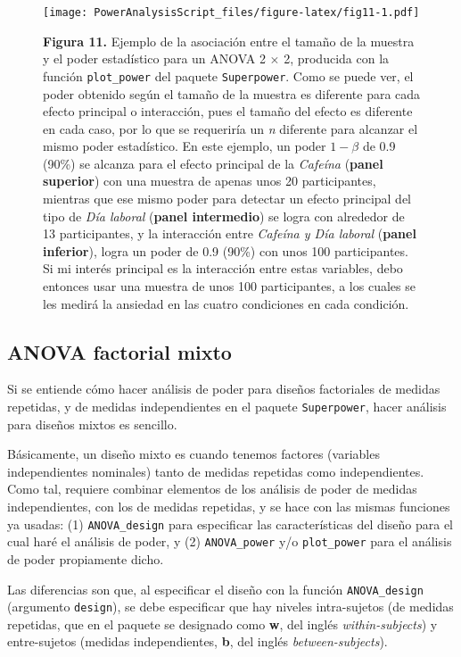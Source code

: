 \documentclass[
]{article}
\begin{document}
\begin{figure}
\centering
\texttt{[image: PowerAnalysisScript\_files/figure-latex/fig11-1.pdf]}
\caption{\textbf{Figura 11.} Ejemplo de la asociación entre el tamaño de
la muestra y el poder estadístico para un ANOVA 2 \(\times\) 2,
producida con la función \texttt{plot\_power} del paquete
\texttt{Superpower}. Como se puede ver, el poder obtenido según el
tamaño de la muestra es diferente para cada efecto principal o
interacción, pues el tamaño del efecto es diferente en cada caso, por lo
que se requeriría un \emph{n} diferente para alcanzar el mismo poder
estadístico. En este ejemplo, un poder \(1-\beta\) de 0.9 (90\%) se
alcanza para el efecto principal de la \emph{Cafeína} (\textbf{panel
superior}) con una muestra de apenas unos 20 participantes, mientras que
ese mismo poder para detectar un efecto principal del tipo de \emph{Día
laboral} (\textbf{panel intermedio}) se logra con alrededor de 13
participantes, y la interacción entre \emph{Cafeína y Día laboral}
(\textbf{panel inferior}), logra un poder de 0.9 (90\%) con unos 100
participantes. Si mi interés principal es la interacción entre estas
variables, debo entonces usar una muestra de unos 100 participantes, a
los cuales se les medirá la ansiedad en las cuatro condiciones en cada
condición.}
\end{figure}

\hypertarget{anova-factorial-mixto}{%
\subsection{ANOVA factorial mixto}\label{anova-factorial-mixto}}

Si se entiende cómo hacer análisis de poder para diseños factoriales de
medidas repetidas, y de medidas independientes en el paquete
\texttt{Superpower}, hacer análisis para diseños mixtos es sencillo.

Básicamente, un diseño mixto es cuando tenemos factores (variables
independientes nominales) tanto de medidas repetidas como
independientes. Como tal, requiere combinar elementos de los análisis de
poder de medidas independientes, con los de medidas repetidas, y se hace
con las mismas funciones ya usadas: (1) \texttt{ANOVA\_design} para
especificar las características del diseño para el cual haré el análisis
de poder, y (2) \texttt{ANOVA\_power} y/o \texttt{plot\_power} para el
análisis de poder propiamente dicho.

Las diferencias son que, al especificar el diseño con la función
\texttt{ANOVA\_design} (argumento \texttt{design}), se debe especificar
que hay niveles intra-sujetos (de medidas repetidas, que en el paquete
se designado como \textbf{w}, del inglés \emph{within-subjects}) y
entre-sujetos (medidas independientes, \textbf{b}, del inglés
\emph{between-subjects}).
\end{document}

